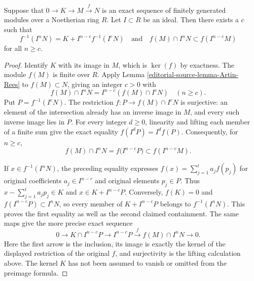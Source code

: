 \begin{lemma}
\label{editorial-source-lemma-map-AR}
Suppose that $0 \to K \to M \xrightarrow{f} N$ is an
exact sequence of finitely generated modules
over a Noetherian ring $R$. Let $I \subset R$ be an ideal.
Then there exists a $c$ such that
$$
f^{-1}(I^nN) = K + I^{n-c}f^{-1}(I^cN)
\quad\text{and}\quad
f(M) \cap I^nN \subset f(I^{n - c}M)
$$
for all $n \geq c$.
\end{lemma}

\begin{proof}
Identify $K$ with its image in $M$, which is $\ker(f)$ by
exactness. The module $f(M)$ is finite over $R$.
Apply Lemma \ref{editorial-source-lemma-Artin-Rees} to $f(M)\subset N$, giving
an integer $c>0$ with
$$
f(M)\cap I^nN=I^{n-c}(f(M)\cap I^cN)\quad(n\geq c).
$$
Put $P=f^{-1}(I^cN)$. The restriction $f:P\to f(M)\cap I^cN$
is surjective: an element of the intersection already has an
inverse image in $M$, and every such inverse image lies in $P$.
For every integer $d\geq0$, linearity and lifting each member
of a finite sum give the exact equality
$f(I^dP)=I^d f(P)$.
Consequently, for $n\geq c$,
$$
f(M)\cap I^nN
=f\bigl(I^{n-c}P\bigr)
\subset f(I^{n-c}M).
$$

If $x\in f^{-1}(I^nN)$, the preceding equality expresses
$f(x)=\sum_{j=1}^t a_jf(p_j)$ for original coefficients
$a_j\in I^{n-c}$ and original elements $p_j\in P$.
Thus $x-\sum_{j=1}^t a_jp_j\in K$ and
$x\in K+I^{n-c}P$. Conversely, $f(K)=0$ and
$f(I^{n-c}P)\subset I^nN$, so every member of
$K+I^{n-c}P$ belongs to $f^{-1}(I^nN)$. This proves the
first equality as well as the second claimed containment.
The same maps give the more precise exact sequence
$$
0\longrightarrow K\cap I^{n-c}P
\longrightarrow I^{n-c}P
\xrightarrow{\ f\ }f(M)\cap I^nN
\longrightarrow0.
$$
Here the first arrow is the inclusion, its image is exactly the
kernel of the displayed restriction of the original $f$, and
surjectivity is the lifting calculation above. The kernel $K$
has not been assumed to vanish or omitted from the preimage formula.
\end{proof}